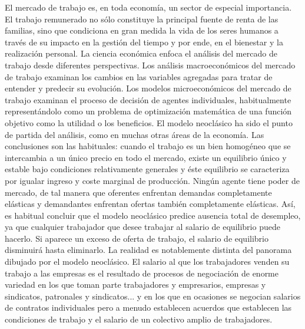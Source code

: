 \documentclass{nuevotema}
\begin{document}
\ideaclave

El mercado de trabajo es, en toda economía, un sector de especial importancia. El trabajo remunerado no sólo constituye la principal fuente de renta de las familias, sino que condiciona en gran medida la vida de los seres humanos a través de su impacto en la gestión del tiempo y por ende, en el bienestar y la realización personal. La ciencia económica enfoca el análisis del mercado de trabajo desde diferentes perspectivas. Los análisis macroeconómicos del mercado de trabajo examinan los cambios en las variables agregadas para tratar de entender y predecir su evolución. Los modelos microeconómicos del mercado de trabajo examinan el proceso de decisión de agentes individuales, habitualmente representándolo como un problema de optimización matemática de una función objetivo como la utilidad o los beneficios. El modelo neoclásico ha sido el punto de partida del análisis, como en muchas otras áreas de la economía. Las conclusiones son las habituales: cuando el trabajo es un bien homogéneo que se intercambia a un único precio en todo el mercado, existe un equilibrio único y estable bajo condiciones relativamente generales y éste equilibrio se caracteriza por igualar ingreso y coste marginal de producción. Ningún agente tiene poder de mercado, de tal manera que oferentes enfrentan demandas completamente elásticas y demandantes enfrentan ofertas también completamente elásticas. Así, es habitual concluir que el modelo neoclásico predice ausencia total de desempleo, ya que cualquier trabajador que desee trabajar al salario de equilibrio puede hacerlo. Si aparece un exceso de oferta de trabajo, el salario de equilibrio disminuirá hasta eliminarlo. La realidad es notablemente distinta del panorama dibujado por el modelo neoclásico. El salario al que los trabajadores venden su trabajo a las empresas es el resultado de procesos de negociación de enorme variedad en los que toman parte trabajadores y empresarios, empresas y sindicatos, patronales y sindicatos... y en los que en ocasiones se negocian salarios de contratos individuales pero a menudo establecen acuerdos que establecen las condiciones de trabajo y el salario de un colectivo amplio de trabajadores. 
\end{document}
